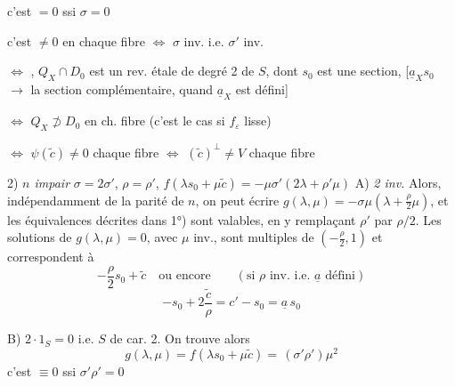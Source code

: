 \documentclass[11pt,a4paper]{article}
\begin{document}
\quad c'est $= 0$ ssi $\sigma = 0$

\quad c'est $\neq 0$ en chaque fibre $\Longleftrightarrow$ 
$\sigma$ inv. i.e. $\sigma'$ inv.

\quad $\Longleftrightarrow$ , $Q_X \cap D_0$ est un rev.
étale de degré 2 de $S$, dont $s_0$ est une section, [$\underline{a}_X s_0$
$\to$ la section complémentaire, quand $\underline{a}_X$ est défini]

\quad $\Longleftrightarrow$ $Q_X \not\supset D_0$ en ch. fibre (c'est le cas
si $f_\varepsilon$ lisse)

\quad $\Longleftrightarrow$ $\psi(\tilde{c}) \neq 0$ chaque fibre
$\Longleftrightarrow$ $(\tilde{c})^{\perp} \neq V$ chaque fibre


2) \emph{$n$ impair} \quad $\sigma = 2\sigma'$, $\rho = \rho'$,
\quad $f(\lambda s_0 + \mu\tilde{c}) = -\mu\sigma'(2\lambda + \rho'\mu)$
A) \emph{2 inv.}  Alors, indépendamment de la parité de $n$,
on peut écrire $g(\lambda, \mu) = -\sigma\mu(\lambda + \frac{\rho}{2}\mu)$, et
les équivalences décrites dans 1°) sont valables, en y remplaçant $\rho'$ par
$\rho/2$. Les solutions de $g(\lambda, \mu) = 0$, avec $\mu$ inv., sont
multiples de $(-\frac{\rho}{2}, 1)$ et correspondent à
\[
-\frac{\rho}{2} s_0 + \tilde{c} \quad \text{ou encore}\quad 
\quad (\text{si } \rho \text{ inv. i.e. } \underline{a} \text{ défini})
\]
\[
-s_0 + 2\frac{\tilde{c}}{\rho} = c' - s_0 = \underline{a}\, s_0
\]


B) $2 \cdot 1_S = 0$ i.e. $S$ de car. 2. On trouve alors
\[
g(\lambda, \mu) = f(\lambda s_0 + \mu\tilde{c}) = \,(\sigma'\rho')\mu^2
\]
c'est $\equiv 0$ ssi $\sigma'\rho' = 0$
\end{document}
